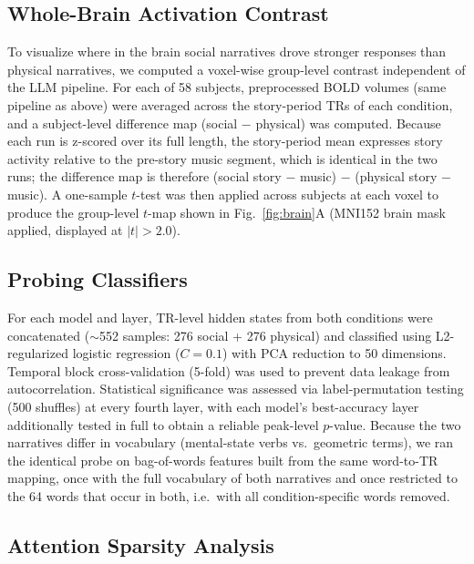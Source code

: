 \documentclass[conference]{IEEEtran}
\begin{document}
\subsection{Whole-Brain Activation Contrast}

To visualize where in the brain social narratives drove stronger responses than physical narratives, we computed a voxel-wise group-level contrast independent of the LLM pipeline. For each of 58 subjects, preprocessed BOLD volumes (same pipeline as above) were averaged across the story-period TRs of each condition, and a subject-level difference map (social $-$ physical) was computed. Because each run is z-scored over its full length, the story-period mean expresses story activity relative to the pre-story music segment, which is identical in the two runs; the difference map is therefore (social story $-$ music) $-$ (physical story $-$ music). A one-sample $t$-test was then applied across subjects at each voxel to produce the group-level $t$-map shown in Fig.~\ref{fig:brain}A (MNI152 brain mask applied, displayed at $|t|>2.0$).

\subsection{Probing Classifiers}

For each model and layer, TR-level hidden states from both conditions were concatenated ($\sim$552 samples: 276 social + 276 physical) and classified using L2-regularized logistic regression ($C = 0.1$) with PCA reduction to 50 dimensions. Temporal block cross-validation (5-fold) was used to prevent data leakage from autocorrelation. Statistical significance was assessed via label-permutation testing (500 shuffles) at every fourth layer, with each model's best-accuracy layer additionally tested in full to obtain a reliable peak-level $p$-value. Because the two narratives differ in vocabulary (mental-state verbs vs.\ geometric terms), we ran the identical probe on bag-of-words features built from the same word-to-TR mapping, once with the full vocabulary of both narratives and once restricted to the 64 words that occur in both, i.e.\ with all condition-specific words removed.

\subsection{Attention Sparsity Analysis}
\end{document}
